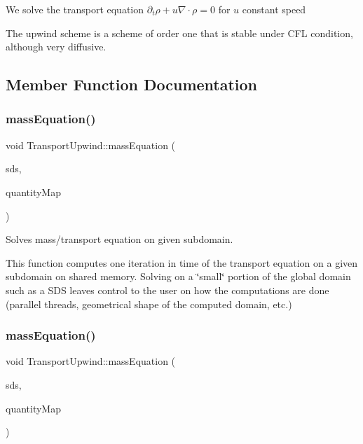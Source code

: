 We solve the transport equation $\partial_t \rho + u \nabla \cdot \rho = 0$ for $u$ constant speed

The upwind scheme is a scheme of order one that is stable under C\+FL condition, although very diffusive. 

\subsection{Member Function Documentation}
\mbox{\label{classTransportUpwind_a1a59087c829238f58f028a544269be54}} 
\subsubsection{\texorpdfstring{mass\+Equation()}{massEquation()}\hspace{0.1cm}{\footnotesize\ttfamily [1/2]}}
{\footnotesize\ttfamily void Transport\+Upwind\+::mass\+Equation (\begin{DoxyParamCaption}\item[{const \hyperlink{classSDShared}{S\+D\+Shared} \&}]{sds,  }\item[{std\+::map$<$ std\+::string, \hyperlink{classQuantity}{Quantity}$<$ real $>$ $\ast$ $>$}]{quantity\+Map }\end{DoxyParamCaption})}



Solves mass/transport equation on given subdomain. 

This function computes one iteration in time of the transport equation on a given subdomain on shared memory. Solving on a \char`\"{}small\char`\"{} portion of the global domain such as a S\+DS leaves control to the user on how the computations are done (parallel threads, geometrical shape of the computed domain, etc.) \mbox{\label{classTransportUpwind_a1a59087c829238f58f028a544269be54}} 
\subsubsection{\texorpdfstring{mass\+Equation()}{massEquation()}\hspace{0.1cm}{\footnotesize\ttfamily [2/2]}}
{\footnotesize\ttfamily void Transport\+Upwind\+::mass\+Equation (\begin{DoxyParamCaption}\item[{const \hyperlink{classSDShared}{S\+D\+Shared} \&}]{sds,  }\item[{std\+::map$<$ std\+::string, \hyperlink{classQuantity}{Quantity}$<$ real $>$ $\ast$ $>$}]{quantity\+Map }\end{DoxyParamCaption})}



